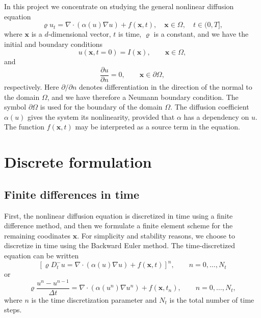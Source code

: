 \documentclass[twoside]{article}
\begin{document}
In this project we concentrate on studying the general nonlinear diffusion equation
\begin{equation}
  \varrho u_{t} = \nabla \cdot \left( \alpha(u)\nabla u\right) + f(\mathbf{x}, t), \quad \mathbf{x} \in \Omega , \quad t \in (0, T] ,
\end{equation}
where $\mathbf{x}$ is a $d$-dimensional vector, $t$ is time, $\varrho $ is a constant, and we have the initial and boundary conditions 
\begin{equation}
  u(\mathbf{x}, t=0) = I(\mathbf{x}), \qquad \mathbf{x} \in \Omega , 
\end{equation}
and
\begin{equation}
  \frac{\partial u}{\partial n} = 0, \qquad \mathbf{x} \in \partial\Omega , 
\end{equation}
respectively. Here $\partial /\partial n$ denotes differentiation in the direction of the normal to the domain $\Omega $, and we have therefore a Neumann boundary condition. The symbol $\partial \Omega $ is used for the boundary of the domain $\Omega $. The diffusion coefficient $\alpha(u)$ gives the system its nonlinearity, provided that $\alpha $ has a dependency on $u$. The function $f(\mathbf{x}, t)$ may be interpreted as a source term in the equation. 



\section{Discrete formulation}
\label{Scheme}

\subsection{Finite differences in time}
First, the nonlinear diffusion equation is discretized in time using a finite difference method, and then we formulate a finite element scheme for the remaining coodinates $\mathbf{x}$. For simplicity and stability reasons, we choose to discretize in time using the Backward Euler method. The time-discretized equation can be written
\begin{equation}
  \left[ \varrho D_{t}^{-}u = \nabla \cdot \left( \alpha(u)\nabla u\right) + f(\mathbf{x}, t) \right]^{n}, \qquad n = 0, \dots , N_{t} 
\end{equation}
or
\begin{equation}
  \varrho \frac{u^{n} - u^{n-1}}{\Delta t} = \nabla \cdot \left( \alpha(u^{n})\nabla u^{n} \right) + f(\mathbf{x}, t_{n}), \qquad n = 0, \dots , N_{t},
\end{equation}
where $n$ is the time discretization parameter and $N_{t}$ is the total number of time steps.
\end{document}
